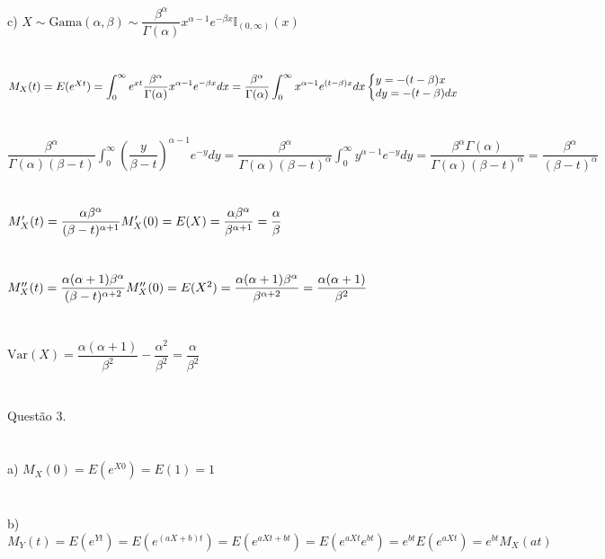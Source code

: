 \documentclass[12pt]{article}
\begin{document}
\indent c) $X \sim \text{Gama}(\alpha, \beta) \sim \dfrac{\beta^{\alpha}}{\Gamma(\alpha)} x^{\alpha-1} e^{-\beta x} \mathds{I}_{(0,\infty)}(x)$\\\\\\
$M_{X}(t) = E(e^{Xt}) = \displaystyle \int_{0}^{\infty} e^{xt} \dfrac{\beta^{\alpha}}{\Gamma(\alpha)} x^{\alpha-1} e^{-\beta x} dx = \dfrac{\beta^{\alpha}}{\Gamma(\alpha)} \int_{0}^{\infty} x^{\alpha-1} e^{(t-\beta)x} dx \hfill
\left \{\begin{array}{@{}l@{}}
	y = -(t-\beta)x\\
	dy = -(t-\beta)dx
\end{array}\right.$\\\\\\
$ \dfrac{\beta^{\alpha}}{\Gamma(\alpha)(\beta-t)}\displaystyle \int_{0}^{\infty} \left( \dfrac{y}{\beta-t} \right)^{\alpha-1} e^{-y} dy = \dfrac{\beta^{\alpha}}{\Gamma(\alpha)(\beta-t)^{\alpha}} \int_{0}^{\infty} y^{\alpha-1} e^{-y} dy = \dfrac{\beta^{\alpha}\Gamma(\alpha)}{\Gamma(\alpha)(\beta-t)^{\alpha}} = \dfrac{\beta^{\alpha}}{(\beta-t)^{\alpha}}$\\\\\\
$M_{X}'(t) = \dfrac{\alpha \beta^{\alpha}}{(\beta-t)^{\alpha+1}} \hfill M_{X}'(0) = E(X) = \dfrac{\alpha \beta^{\alpha}}{\beta^{\alpha+1}} = \dfrac{\alpha}{\beta}$\\\\\\
$M_{X}''(t) = \dfrac{\alpha(\alpha+1)\beta^{\alpha}}{(\beta-t)^{\alpha+2}} \hfill M_{X}''(0) = E(X^{2}) = \dfrac{\alpha(\alpha+1)\beta^{\alpha}}{\beta^{\alpha+2}} = \dfrac{\alpha(\alpha+1)}{\beta^{2}}$\\\\\\
$\text{Var}(X) = \dfrac{\alpha(\alpha+1)}{\beta^{2}} - \dfrac{\alpha^{2}}{\beta^{2}} = \dfrac{\alpha}{\beta^{2}}$\\\\\\

\indent Questão 3.\\\\\\
a) $M_{X}(0) = E(e^{X0}) = E(1) = 1$\\\\\\
b) $M_{Y}(t) = E(e^{Yt}) = E(e^{(aX+b)t}) = E(e^{aXt+bt}) = E(e^{aXt}e^{bt}) = e^{bt} E(e^{aXt}) = e^{bt} M_{X}(at)$\\\\\\
\end{document}
